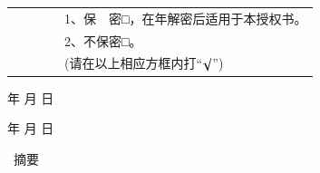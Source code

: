 {{            \vspace{0.5cm}
            \begin{center}\hei\xiaoer{\@authorizedtitle}\end{center}\par
            \vspace{0.5\baselineskip}
            \song{}\par
            \song{}\par
            \begin{tabular}{lll}
                \qquad\qquad& \qquad\quad\qquad&\ \ \ \ 1、保　密□，在\underline{\qquad\qquad}年解密后适用于本授权书。 \\
                \qquad\qquad& \qquad\quad\qquad&\ \ \ \ 2、不保密□。                                       \\
                \qquad\qquad& \qquad\quad\qquad&\ \ \ \ (请在以上相应方框内打``$\surd$'')
            \end{tabular}
            \par
            \vspace{1\baselineskip}
            \song\xiaosi
            \@studentsign \makebox[3cm][s]{} \qquad\qquad\qquad  
            \makebox[0.5cm][s]{} 年 \makebox[0.5cm][s]{} 月 \makebox[0.5cm][s]{} 日\par
            \vspace{0.25\baselineskip}
            \@teachersign \makebox[3cm][s]{} \qquad\qquad\qquad  
            \makebox[0.5cm][s]{} 年 \makebox[0.5cm][s]{} 月 \makebox[0.5cm][s]{} 日
        }
        \clearpage

         {
            \begin{center}
                \hei\xiaoer{\@title}
            \end{center}\par
            \vspace{0.5\baselineskip}
            \begin{center}
                \hei\xiaoer\ 摘\qquad 要
            \end{center}\par
            \vspace{0.5\baselineskip}
            \song{}\@cabstract
            \vspace{\baselineskip}
            \hangindent=52.3pt\noindent
            \newline\noindent
            {\hei{} \hei\xiaosi\@ckeywords}
        }
        \clearpage
        
}
